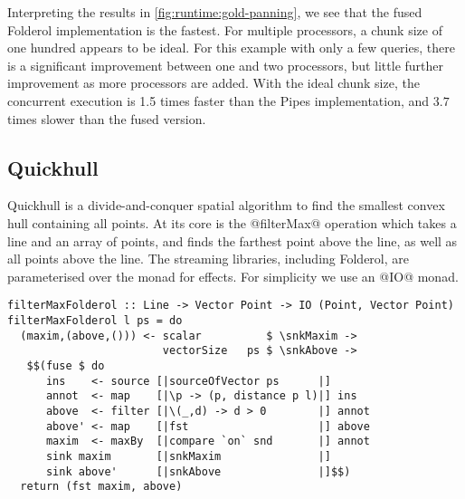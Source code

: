 Interpreting the results in \cref{fig:runtime:gold-panning}, we see that the fused Folderol implementation is the fastest.
For multiple processors, a chunk size of one hundred appears to be ideal.
For this example with only a few queries, there is a significant improvement between one and two processors, but little further improvement as more processors are added.
With the ideal chunk size, the concurrent execution is 1.5 times faster than the Pipes implementation, and $3.7$ times slower than the fused version.


\subsection{Quickhull}

Quickhull is a divide-and-conquer spatial algorithm to find the smallest convex hull containing all points.
At its core is the @filterMax@ operation which takes a line and an array of points, and finds the farthest point above the line, as well as all points above the line.
The streaming libraries, including Folderol, are parameterised over the monad for effects. For simplicity we use an @IO@ monad.

\begin{lstlisting}[float,label=l:bench:filterMaxFolderol,caption=Folderol implementation of filterMax]
filterMaxFolderol :: Line -> Vector Point -> IO (Point, Vector Point)
filterMaxFolderol l ps = do
  (maxim,(above,())) <- scalar          $ \snkMaxim ->
                        vectorSize   ps $ \snkAbove ->
   $$(fuse $ do
      ins    <- source [|sourceOfVector ps      |]
      annot  <- map    [|\p -> (p, distance p l)|] ins
      above  <- filter [|\(_,d) -> d > 0        |] annot
      above' <- map    [|fst                    |] above
      maxim  <- maxBy  [|compare `on` snd       |] annot
      sink maxim       [|snkMaxim               |]
      sink above'      [|snkAbove               |]$$)
  return (fst maxim, above)
\end{lstlisting}

